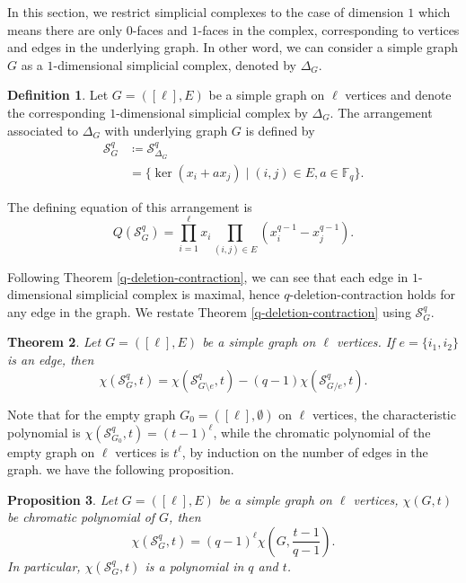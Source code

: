 \documentclass[12pt]{article}
\theoremstyle{plain}%
\newtheorem{theorem}{Theorem}[section]
\newtheorem{proposition}[theorem]{Proposition}
\theoremstyle{definition}
\newtheorem{definition}[theorem]{Definition}
\begin{document}
In this section, we restrict simplicial complexes to the case of dimension $1$ which means there are only $0$-faces and $1$-faces in the complex, corresponding to vertices and edges in the underlying graph. In other word, we can consider a simple graph $G$ as a $1$-dimensional simplicial complex, denoted by $\Delta_G$.

\begin{definition}\label{Definition of graphic monomial arrangement}
    Let $G=([\ell], E)$ be a simple graph on $\ell$ vertices and denote the corresponding $1$-dimensional simplicial complex by $\Delta_G$.
    The arrangement associated to $\Delta_G$ with underlying graph $G$ is defined by
    \begin{align*}
        \mathcal{S}_G^q &\coloneqq \mathcal{S}_{\Delta_G}^q \\
        &=\{\ker{(x_i+ax_j)}\mid (i,j)\in E, a\in \mathbb{F}_q\}.
    \end{align*}
   
\end{definition}

The defining equation of this arrangement is 
$$Q(\mathcal{S}_G^q)=\prod_{i=1}^\ell x_i\prod_{(i,j)\in E}(x_i^{q-1}-x_j^{q-1}).$$

Following Theorem \ref{q-deletion-contraction}, we can see that each edge in $1$-dimensional simplicial complex is maximal, hence $q$-deletion-contraction holds for any edge in the graph. We restate Theorem \ref{q-deletion-contraction} using $\mathcal{S}_G^q$.

\begin{theorem}\label{q-deletion-contraction of GMA}
    Let $G=([\ell], E)$ be a simple graph on $\ell$ vertices. If $e=\{i_1, i_2\}$ is an edge, then
    $$\chi(\mathcal{S}_{G}^{q}, t)=\chi(\mathcal{S}_{G\setminus e}^{q}, t)-(q-1)\chi(\mathcal{S}_{G/e}^{q}, t).$$
\end{theorem}

Note that for the empty graph $G_0 =([\ell], \emptyset)$ on $\ell$ vertices, the characteristic polynomial is $\chi(\mathcal{S}_{G_0}^q,t)=(t-1)^\ell$, while the chromatic polynomial of the empty graph on $\ell$ vertices is $t^\ell$, by induction on the number of edges in the graph. we have the following proposition.

\begin{proposition}\label{prop4.3}
    Let $G=([\ell], E)$ be a simple graph on $\ell$ vertices, $\chi(G, t)$ be chromatic polynomial of $G$, then
    $$\chi(\mathcal{S}_{G}^{q}, t)=(q-1)^\ell\chi(G,\frac{t-1}{q-1}).$$
    {In particular, $\chi(\mathcal{S}_{G}^{q}, t)$ is a polynomial in $q$ and $t$.}
\end{proposition}
\end{document}

